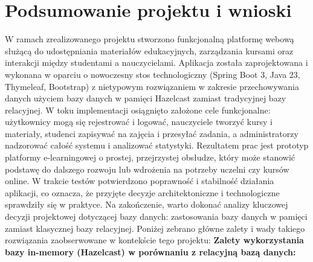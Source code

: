 
\chapter{Podsumowanie projektu i wnioski}
W ramach zrealizowanego projektu stworzono funkcjonalną platformę webową służącą do udostępniania materiałów edukacyjnych, zarządzania kursami oraz interakcji między studentami a nauczycielami. Aplikacja została zaprojektowana i wykonana w oparciu o nowoczesny stos technologiczny (Spring Boot 3, Java 23, Thymeleaf, Bootstrap) z nietypowym rozwiązaniem w zakresie przechowywania danych użyciem bazy danych w pamięci Hazelcast zamiast tradycyjnej bazy relacyjnej. W toku implementacji osiągnięto założone cele funkcjonalne: użytkownicy mogą się rejestrować i logować, nauczyciele tworzyć kursy i materiały, studenci zapisywać na zajęcia i przesyłać zadania, a administratorzy nadzorować całość systemu i analizować statystyki. Rezultatem prac jest prototyp platformy e-learningowej o prostej, przejrzystej obsłudze, który może stanowić podstawę do dalszego rozwoju lub wdrożenia na potrzeby uczelni czy kursów online. W trakcie testów potwierdzono poprawność i stabilność działania aplikacji, co oznacza, że przyjęte decyzje architektoniczne i technologiczne sprawdziły się w praktyce. Na zakończenie, warto dokonać analizy kluczowej decyzji projektowej dotyczącej bazy danych: zastosowania bazy danych w pamięci zamiast klasycznej bazy relacyjnej. Poniżej zebrano główne zalety i wady takiego rozwiązania zaobserwowane w kontekście tego projektu: \textbf{Zalety wykorzystania bazy in-memory (Hazelcast) w porównaniu z relacyjną bazą danych:}
